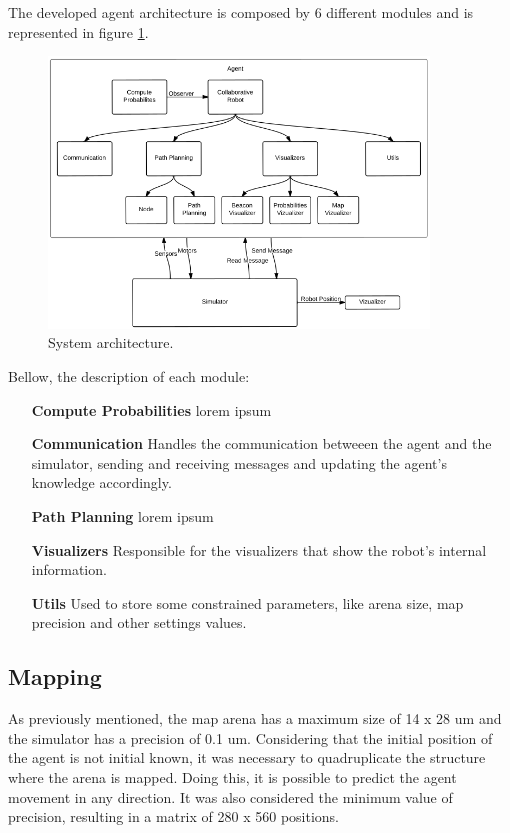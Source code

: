 \documentclass[oribibl]{llncs}
\begin{document}
The developed agent architecture is composed by 6 different modules and is represented in figure \ref{fig:robot-arch}.

\begin{figure}
  \centering
  \includegraphics[width=0.9\textwidth]{robot-architecture.png}
  \caption{System architecture.}
  \label{fig:robot-arch}
\end{figure}

Bellow, the description of each module:

\begin{itemize}
  \item[\textbf{Compute Probabilities}]
  lorem ipsum
  \item[\textbf{Communication}]
  Handles the communication betweeen the agent and the simulator, sending and receiving messages and updating the agent's knowledge accordingly. 
  \item[\textbf{Path Planning}]
  lorem ipsum
  \item[\textbf{Visualizers}]
  Responsible for the visualizers that show the robot's internal information.
  \item[\textbf{Utils}]
  Used to store some constrained parameters, like arena size, map precision and other settings values.
\end{itemize}

\subsection{Mapping}

As previously mentioned, the map arena has a maximum size of 14 x 28 um and the simulator has a precision of 0.1 um. Considering that the initial position of the agent is not initial known, it was necessary to quadruplicate the structure where the arena is mapped. Doing this, it is possible to predict the agent movement in any direction. It was also considered the minimum value of precision, resulting in a matrix of 280 x 560 positions. 
\end{document}
